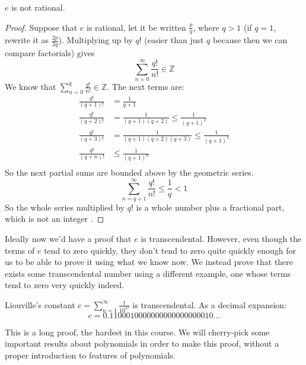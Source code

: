 \begin{proposition}
	\(e\) is not rational.
\end{proposition}
\begin{proof}
	Suppose that \(e\) is rational, let it be written \(\frac{p}{q}\), where \(q > 1\) (if \(q=1\), rewrite it as \(\frac{2p}{2q}\)).
	Multiplying up by \(q!
	\) (easier than just \(q\) because then we can compare factorials) gives
	\[
		\sum_{n=0}^\infty \frac{q!}{n!} \in \mathbb Z
	\]
	We know that \(\sum_{n=0}^q \frac{q!}{n!} \in \mathbb Z\).
	The next terms are:
	\begin{align*}
		\frac{q!}{(q+1)!} & = \frac{1}{q+1}                                    \\
		\frac{q!}{(q+2)!} & = \frac{1}{(q+1)(q+2)} \leq \frac{1}{(q+1)^2}      \\
		\frac{q!}{(q+3)!} & = \frac{1}{(q+1)(q+2)(q+3)} \leq \frac{1}{(q+1)^3} \\
		\frac{q!}{(q+n)!} & \leq \frac{1}{(q+1)^n}                             \\
	\end{align*}
	So the next partial sums are bounded above by the geometric series.
	\[
		\sum_{n=q+1}^\infty \frac{q!}{n!} \leq \frac{1}{q} < 1
	\]
	So the whole series multiplied by \(q!
	\) is a whole number plus a fractional part, which is not an integer \contradiction.
\end{proof}
Ideally now we'd have a proof that \(e\) is transcendental.
However, even though the terms of \(e\) tend to zero quickly, they don't tend to zero quite quickly enough for us to be able to prove it using what we know now.
We instead prove that there exists some transcendental number using a different example, one whose terms tend to zero very quickly indeed.
\begin{theorem}
	Liouville's constant \(c = \sum_{n=1}^\infty \frac{1}{10^{n!}}\) is transcendental.
	As a decimal expansion:
	\[
		c = 0.1100010000000000000000010\dots
	\]
\end{theorem}
This is a long proof, the hardest in this course.
We will cherry-pick some important results about polynomials in order to make this proof, without a proper introduction to features of polynomials.

